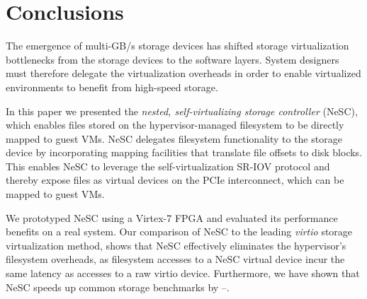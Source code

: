 \section{Conclusions}
\label{sec:conclusions}

The emergence of multi-GB/s storage devices has shifted storage virtualization bottlenecks from the storage devices to the software layers. System designers must therefore delegate the virtualization overheads in order to enable virtualized environments to benefit from high-speed storage. 

In this paper we presented the \emph{nested, self-virtualizing storage controller} (NeSC), which enables files stored on the hypervisor-managed filesystem to be directly mapped to guest VMs. NeSC delegates filesystem functionality to the storage device by incorporating mapping facilities that translate file offsets to disk blocks. This enables NeSC to leverage the self-virtualization SR-IOV protocol and thereby expose files as virtual devices on the PCIe interconnect, which can be mapped to guest VMs.

We prototyped NeSC using a Virtex-7 FPGA and evaluated its performance benefits on a real system. Our comparison of NeSC to the leading \emph{virtio} storage virtualization method, shows that NeSC effectively eliminates the hypervisor's filesystem overheads, as filesystem accesses to a NeSC virtual device incur the same latency as accesses to a raw virtio device.
Furthermore, we have shown that NeSC speeds up common storage benchmarks by --.
